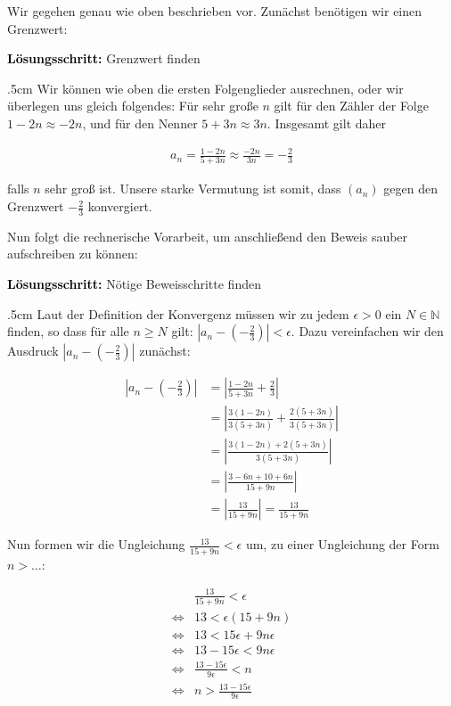 \documentclass[fontsize=9pt,
               parskip=half-,
               DIV=14,
               listof=chapterentry,
               tocflat]{scrbook}
\newenvironment{indentblock}{\begin{adjustwidth}{.5cm}{}}{\end{adjustwidth}}
\newcommand{\proofstep}[1]{\textbf{\textcolor{Black}{#1}}}
\begin{document}
\begin{solutionprocess*}
Wir gegehen genau wie oben beschrieben vor. Zunächst benötigen wir einen Grenzwert:

\proofstep{Lösungsschritt:}
 Grenzwert finden\begin{indentblock}
Wir können wie oben die ersten Folgenglieder ausrechnen, oder wir überlegen uns gleich folgendes: Für sehr große $n$ gilt für den Zähler der Folge $1-2n\approx -2n$, und für den Nenner $5+3n\approx 3n$. Insgesamt gilt daher

\begin{align*}
a_{n}={\frac {1-2n}{5+3n}}\approx {\frac {-2n}{3n}}=-{\frac {2}{3}}
\end{align*}

falls $n$ sehr groß ist. Unsere starke Vermutung ist somit, dass $(a_{n})$ gegen den Grenzwert $-{\tfrac {2}{3}}$ konvergiert.

\end{indentblock}

Nun folgt die rechnerische Vorarbeit, um anschließend den Beweis sauber aufschreiben zu können:

\proofstep{Lösungsschritt:}
 Nötige Beweisschritte finden\begin{indentblock}
Laut der Definition der Konvergenz müssen wir zu jedem $\epsilon >0$ ein $N\in \mathbb {N} $ finden, so dass für alle $n\geq N$ gilt: $|a_{n}-(-{\tfrac {2}{3}})|<\epsilon $. Dazu vereinfachen wir den Ausdruck $|a_{n}-(-{\tfrac {2}{3}})|$ zunächst:

\begin{align*}
|a_{n}-(-{\tfrac {2}{3}})|&=\left|{\frac {1-2n}{5+3n}}+{\frac {2}{3}}\right|\\[0.3em]&=\left|{\frac {3(1-2n)}{3(5+3n)}}+{\frac {2(5+3n)}{3(5+3n)}}\right|\\[0.3em]&=\left|{\frac {3(1-2n)+2(5+3n)}{3(5+3n)}}\right|\\[0.3em]&=\left|{\frac {3-6n+10+6n}{15+9n}}\right|\\[0.3em]&=\left|{\frac {13}{15+9n}}\right|={\frac {13}{15+9n}}
\end{align*}

Nun formen wir die Ungleichung ${\tfrac {13}{15+9n}}<\epsilon $ um, zu einer Ungleichung der Form $n>\ldots $:

\begin{align*}
&{\frac {13}{15+9n}}<\epsilon \\[0.3em]\iff &13<\epsilon (15+9n)\\[0.3em]\iff &13<15\epsilon +9n\epsilon \\[0.3em]\iff &13-15\epsilon <9n\epsilon \\[0.3em]\iff &{\frac {13-15\epsilon }{9\epsilon }}<n\\[0.3em]\iff &n>{\frac {13-15\epsilon }{9\epsilon }}
\end{align*}


\end{indentblock}
\end{solutionprocess*}
\end{document}

